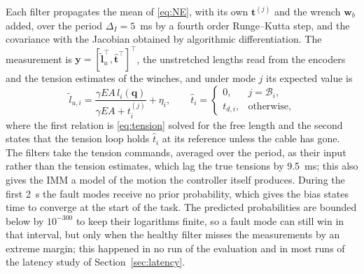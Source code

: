\documentclass{interact}
\newcommand{\vc}[1]{\bm{#1}}
\begin{document}
Each filter propagates the mean of \eqref{eq:NE}, with its own $\vc t^{(j)}$ and the wrench $\vc w_b$ added, over the period $\Delta_I=5$~ms by a fourth order Runge--Kutta step, and the covariance with the Jacobian obtained by algorithmic differentiation. The measurement is $\vc y=[\tilde{\vc l}_u^\top,\hat{\vc t}^\top]^\top$, the unstretched lengths read from the encoders and the tension estimates of the winches, and under mode $j$ its expected value is
\begin{equation}\label{eq:h}
\tilde l_{u,i}=\frac{\gamma EA\,l_i(\vc q)}{\gamma EA+t_i^{(j)}}+\eta_i,\qquad
\hat t_i=\begin{cases}0,&j=\mathcal B_i,\\ t_{d,i},&\text{otherwise},\end{cases}
\end{equation}
where the first relation is \eqref{eq:tension} solved for the free length and the second states that the tension loop holds $\hat t_i$ at its reference unless the cable has gone. The filters take the tension commands, averaged over the period, as their input rather than the tension estimates, which lag the true tensions by 9.5~ms; this also gives the IMM a model of the motion the controller itself produces. During the first 2~s the fault modes receive no prior probability, which gives the bias states time to converge at the start of the task. The predicted probabilities are bounded below by $10^{-300}$ to keep their logarithms finite, so a fault mode can still win in that interval, but only when the healthy filter misses the measurements by an extreme margin; this happened in no run of the evaluation and in most runs of the latency study of Section~\ref{sec:latency}.
\end{document}

